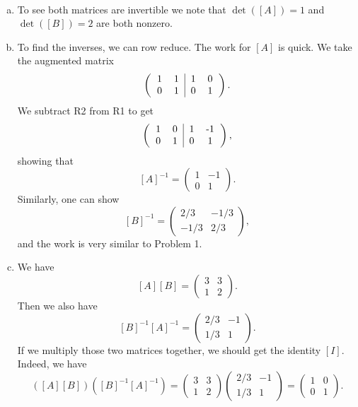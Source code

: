 \documentclass[12pt]{article} %
\begin{document}
\begin{solution}~
\begin{enumerate}[(a)]
    \item To see both matrices are invertible we note that $\det([A])=1$ and $\det([B])=2$ are both nonzero.
    \item To find the inverses, we can row reduce. The work for $[A]$ is quick. We take the augmented matrix
    \[
        \left( \begin{tabular}{cc|cc} 1 & 1 & 1 & 0 \\ 0 & 1 & 0  & 1 \end{tabular} \right).
    \]
    We subtract R2 from R1 to get
    \[
        \left( \begin{tabular}{cc|cc} 1 & 0 & 1 & -1 \\ 0 & 1 & 0  & 1 \end{tabular} \right),
    \]
    showing that
    \[
        [A]^{-1} = \begin{pmatrix} 1 & -1 \\ 0 & 1 \end{pmatrix}.
    \]
    Similarly, one can show
    \[
        [B]^{-1} = \begin{pmatrix} 2/3 & -1/3 \\ -1/3 & 2/3 \end{pmatrix},
    \]
    and the work is very similar to Problem 1.
    \item We have
    \[
    [A][B] = \begin{pmatrix} 3 & 3 \\ 1 & 2 \end{pmatrix}.
    \]
    Then we also have
    \[
    [B]^{-1} [A]^{-1} = \begin{pmatrix} 2/3 & -1 \\ 1/3 & 1 \end{pmatrix}.
    \]
    If we multiply those two matrices together, we should get the identity $[I]$. Indeed, we have
    \[
    ([A][B])([B]^{-1} [A]^{-1}) = \begin{pmatrix} 3 & 3 \\ 1 & 2 \end{pmatrix}\begin{pmatrix} 2/3 & -1 \\ 1/3 & 1 \end{pmatrix} = \begin{pmatrix} 1 & 0 \\ 0 & 1 \end{pmatrix}.
    \]
\end{enumerate}
\end{solution}
\end{document}
